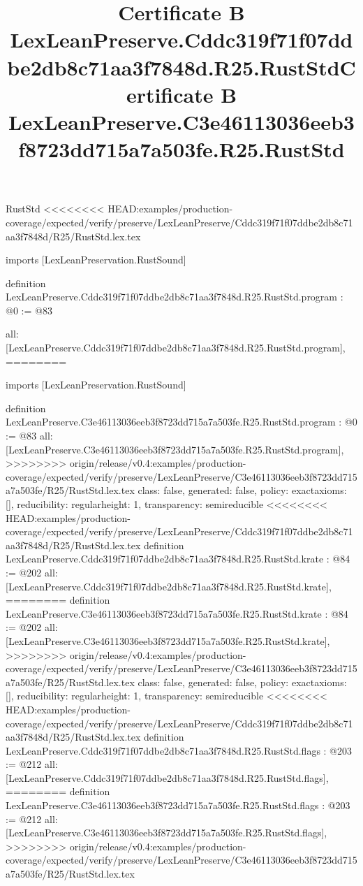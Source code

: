 \begin{lexlean}{RustStd}
<<<<<<<< HEAD:examples/production-coverage/expected/verify/preserve/LexLeanPreserve/Cddc319f71f07ddbe2db8c71aa3f7848d/R25/RustStd.lex.tex
\title{Certificate B LexLeanPreserve.Cddc319f71f07ddbe2db8c71aa3f7848d.R25.RustStd}
\begin{coremodule}
imports [LexLeanPreservation.RustSound]

definition LexLeanPreserve.Cddc319f71f07ddbe2db8c71aa3f7848d.R25.RustStd.program : @0 := @83 {
  all: [LexLeanPreserve.Cddc319f71f07ddbe2db8c71aa3f7848d.R25.RustStd.program],
========
\title{Certificate B LexLeanPreserve.C3e46113036eeb3f8723dd715a7a503fe.R25.RustStd}
\begin{coremodule}
imports [LexLeanPreservation.RustSound]

definition LexLeanPreserve.C3e46113036eeb3f8723dd715a7a503fe.R25.RustStd.program : @0 := @83 {
  all: [LexLeanPreserve.C3e46113036eeb3f8723dd715a7a503fe.R25.RustStd.program],
>>>>>>>> origin/release/v0.4:examples/production-coverage/expected/verify/preserve/LexLeanPreserve/C3e46113036eeb3f8723dd715a7a503fe/R25/RustStd.lex.tex
  class: false,
  generated: false,
  policy: exact{axioms: []},
  reducibility: regular{height: 1},
  transparency: semireducible
}
<<<<<<<< HEAD:examples/production-coverage/expected/verify/preserve/LexLeanPreserve/Cddc319f71f07ddbe2db8c71aa3f7848d/R25/RustStd.lex.tex
definition LexLeanPreserve.Cddc319f71f07ddbe2db8c71aa3f7848d.R25.RustStd.krate : @84 := @202 {
  all: [LexLeanPreserve.Cddc319f71f07ddbe2db8c71aa3f7848d.R25.RustStd.krate],
========
definition LexLeanPreserve.C3e46113036eeb3f8723dd715a7a503fe.R25.RustStd.krate : @84 := @202 {
  all: [LexLeanPreserve.C3e46113036eeb3f8723dd715a7a503fe.R25.RustStd.krate],
>>>>>>>> origin/release/v0.4:examples/production-coverage/expected/verify/preserve/LexLeanPreserve/C3e46113036eeb3f8723dd715a7a503fe/R25/RustStd.lex.tex
  class: false,
  generated: false,
  policy: exact{axioms: []},
  reducibility: regular{height: 1},
  transparency: semireducible
}
<<<<<<<< HEAD:examples/production-coverage/expected/verify/preserve/LexLeanPreserve/Cddc319f71f07ddbe2db8c71aa3f7848d/R25/RustStd.lex.tex
definition LexLeanPreserve.Cddc319f71f07ddbe2db8c71aa3f7848d.R25.RustStd.flags : @203 := @212 {
  all: [LexLeanPreserve.Cddc319f71f07ddbe2db8c71aa3f7848d.R25.RustStd.flags],
========
definition LexLeanPreserve.C3e46113036eeb3f8723dd715a7a503fe.R25.RustStd.flags : @203 := @212 {
  all: [LexLeanPreserve.C3e46113036eeb3f8723dd715a7a503fe.R25.RustStd.flags],
>>>>>>>> origin/release/v0.4:examples/production-coverage/expected/verify/preserve/LexLeanPreserve/C3e46113036eeb3f8723dd715a7a503fe/R25/RustStd.lex.tex
}}}
\end{coremodule}}
\end{coremodule}
\end{lexlean}

